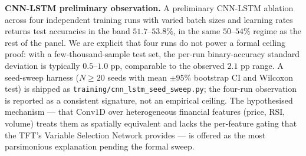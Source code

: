 \documentclass[conference]{IEEEtran}
\begin{document}
\textbf{CNN-LSTM preliminary observation.} A preliminary CNN-LSTM ablation across four independent training runs with varied batch sizes and learning rates returns test accuracies in the band $51.7$--$53.8\%$, in the same $50$--$54\%$ regime as the rest of the panel. We are explicit that four runs do not power a formal ceiling proof: with a few-thousand-sample test set, the per-run binary-accuracy standard deviation is typically $0.5$--$1.0$ pp, comparable to the observed $2.1$ pp range. A seed-sweep harness ($N \geq 20$ seeds with mean $\pm 95\%$ bootstrap CI and Wilcoxon test) is shipped as \texttt{training/cnn\_lstm\_seed\_sweep.py}; the four-run observation is reported as a consistent signature, not an empirical ceiling. The hypothesised mechanism --- that $\text{Conv1D}$ over heterogeneous financial features (price, RSI, volume) treats them as spatially equivalent and lacks the per-feature gating that the TFT's Variable Selection Network provides --- is offered as the most parsimonious explanation pending the formal sweep.
\end{document}
